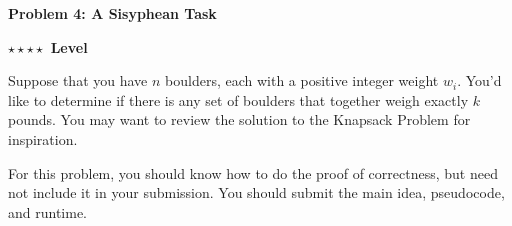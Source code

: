 \documentclass{article}\usepackage[utf8]{inputenc}\usepackage[margin=0.4cm,top=0.4cm,bottom=0.4cm]{geometry}
\begin{document}
\vspace{-2mm}\noindent\begin{mybox}{\begin{center}\textbf{\color{black}Problem 4: A Sisyphean Task}\end{center}}\end{mybox}\vspace{-2mm}
\begin{myboxot}\noindent\textbf{$\star\star\star\star$ Level}\end{myboxot} 

\noindent Suppose that you have $n$ boulders, each with a positive integer weight $w_i$. You'd like to determine if there is any set of boulders that together weigh exactly $k$ pounds. You may want to review the solution to the
Knapsack Problem for inspiration.

\vspace{4pt}
\noindent For this problem, you should know how to do the proof of correctness, but need not include it in your
submission. You should submit the main idea, pseudocode, and runtime.
\end{document}
